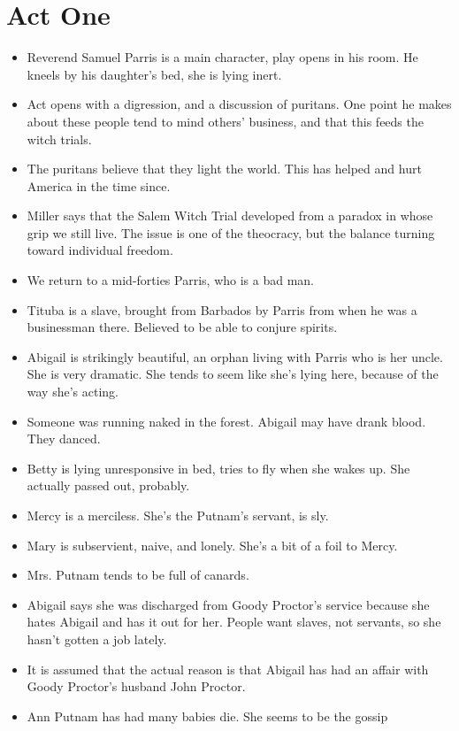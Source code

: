 \documentclass[10pt]{article}
\begin{document}
\section{Act One}
\begin{itemize}
	\item Reverend Samuel Parris is a main character, play opens in his room.
		He kneels by his daughter's bed, she is lying inert.
	\item Act opens with a digression, and a discussion of puritans.  One
		point he makes about these people tend to mind others' business, and
		that this feeds the witch trials.
	\item The puritans believe that they light the world.  This has helped
		and hurt America in the time since.
	\item Miller says that the Salem Witch Trial developed from a paradox
		in whose grip we still live.  The issue is one of the theocracy, but
		the balance turning toward individual freedom.
	\item We return to a mid-forties Parris, who is a bad man.
	\item Tituba is a slave, brought from Barbados by Parris from when he
		was a businessman there.  Believed to be able to conjure spirits.
	\item Abigail is strikingly beautiful, an orphan living with Parris
		who is her uncle.  She is very dramatic.  She tends to seem like
		she's lying here, because of the way she's acting.
	\item Someone was running naked in the forest.  Abigail may have drank 
		blood.  They danced.
	\item Betty is lying unresponsive in bed, tries to fly when she wakes
		up.  She actually passed out, probably.
	\item Mercy is a merciless.  She's the Putnam's servant, is sly.
	\item Mary is subservient, naive, and lonely.  She's a bit of a foil
		to Mercy.
	\item Mrs. Putnam tends to be full of canards.
	\item Abigail says she was discharged from Goody Proctor's service
		because she hates Abigail and has it out for her.  People want 
		slaves, not servants, so she hasn't gotten a job lately.
	\item It is assumed that the actual reason is that Abigail has
		had an affair with Goody Proctor's husband John Proctor.
	\item Ann Putnam has had many babies die.  She seems to be the gossip

\end{itemize}
\end{document}
